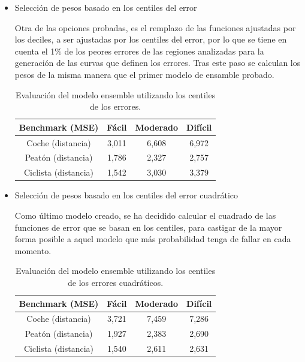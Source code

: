 \begin{itemize}
    \item Selección de pesos basado en los centiles del error
    
    Otra de las opciones probadas, es el remplazo de las funciones ajustadas por los deciles, a ser ajustadas por los centiles del error, por lo que se tiene en cuenta el 1\% de los peores errores de las regiones analizadas para la generación de las curvas que definen los errores. Tras este paso se calculan los pesos de la misma manera que el primer modelo de ensamble probado.
\begin{table}[H]
\centering
\begin{tabular}{|c|c|c|c|}
\hline
\textbf{Benchmark (MSE)} & \textbf{Fácil} & \textbf{Moderado} & \textbf{Difícil}\\ \hline \hline
Coche (distancia)        & 3,011          & 6,608             & 6,972\\ \hline
Peatón (distancia)       & 1,786          & 2,327             & 2,757\\ \hline
Ciclista (distancia)     & 1,542          & 3,030             & 3,379\\ \hline
\end{tabular}
\caption{Evaluación del modelo ensemble utilizando los centiles de los errores.}
\label{tab:Evaluación del modelo ensemble utilizando los centiles de los errores.}
\end{table}

    \item Selección de pesos basado en los centiles del error cuadrático
    
    Como último modelo creado, se ha decidido calcular el cuadrado de las funciones de error que se basan en los centiles, para castigar de la mayor forma posible a aquel modelo que más probabilidad tenga de fallar en cada momento.
\begin{table}[H]
\centering
\begin{tabular}{|c|c|c|c|}
\hline
\textbf{Benchmark (MSE)} & \textbf{Fácil} & \textbf{Moderado} & \textbf{Difícil}\\ \hline \hline
Coche (distancia)        & 3,721          & 7,459             & 7,286\\ \hline
Peatón (distancia)       & 1,927          & 2,383             & 2,690\\ \hline
Ciclista (distancia)     & 1,540          & 2,611             & 2,631\\ \hline
\end{tabular}
\caption{Evaluación del modelo ensemble utilizando los centiles de los errores cuadráticos.}
\label{tab:Evaluación del modelo ensemble utilizando los centiles de los errores cuadráticos.}
\end{table}

\end{itemize}

